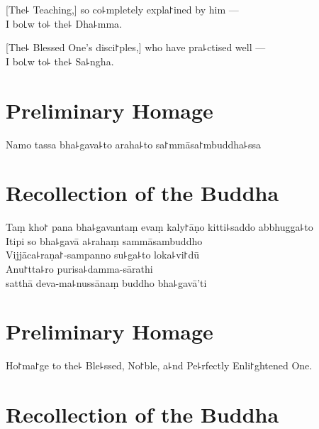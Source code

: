 [The꜕ Teaching,] so co꜕mpletely expla꜓ined by him ---\\
I bo꜖w to꜕ the꜕ Dha꜕mma. 

[The꜕ Blessed One's disci꜓ples,] who have pra꜕ctised well ---\\
I bo꜖w to꜕ the꜕ Sa꜕ngha. 

\clearpage

\chapter{Preliminary Homage}%

\begin{leader}
\end{leader}

Namo tassa bha꜕gava꜕to araha꜕to sa꜓mmāsa꜓mbuddha꜕ssa


\chapter{Recollection of the Buddha}%

\begin{leader}
\end{leader}

Taṃ kho꜓ pana bha꜕gavantaṃ evaṃ kaly꜓āṇo kitti꜕saddo abbhugga꜕to\\
Itipi so bha꜕gavā a꜕rahaṃ sammāsambuddho\\
Vijjāca꜕raṇa꜓-sampanno su꜕ga꜕to loka꜕vi꜓dū\\
Anu꜓tta꜕ro purisa꜕damma-sārathi\\
\vin satthā deva-ma꜕nussānaṃ buddho bha꜕gavā'ti

\clearpage

\chapter{Preliminary Homage}%

\begin{leader}
\end{leader}

Ho꜓ma꜓ge to the꜕ Ble꜕ssed, No꜓ble, a꜕nd Pe꜕rfectly Enli꜓ghtened One.


\chapter{Recollection of the Buddha}%

